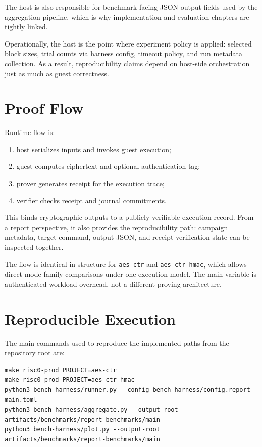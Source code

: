 The host is also responsible for benchmark-facing JSON output fields used by the
aggregation pipeline, which is why implementation and evaluation chapters are
tightly linked.

Operationally, the host is the point where experiment policy is applied:
selected block sizes, trial counts via harness config, timeout policy, and run
metadata collection. As a result, reproducibility claims depend on host-side
orchestration just as much as guest correctness.

\section{Proof Flow}

Runtime flow is:

\begin{enumerate}
\item host serializes inputs and invokes guest execution;
\item guest computes ciphertext and optional authentication tag;
\item prover generates receipt for the execution trace;
\item verifier checks receipt and journal commitments.
\end{enumerate}

This binds cryptographic outputs to a publicly verifiable execution record.
From a report perspective, it also provides the reproducibility path: campaign
metadata, target command, output JSON, and receipt verification state can be
inspected together.

The flow is identical in structure for \texttt{aes-ctr} and
\texttt{aes-ctr-hmac}, which allows direct mode-family comparisons under one
execution model. The main variable is authenticated-workload overhead, not a
different proving architecture.

\section{Reproducible Execution}

The main commands used to reproduce the implemented paths from the repository
root are:

\begin{verbatim}
make risc0-prod PROJECT=aes-ctr
make risc0-prod PROJECT=aes-ctr-hmac
python3 bench-harness/runner.py --config bench-harness/config.report-main.toml
python3 bench-harness/aggregate.py --output-root artifacts/benchmarks/report-benchmarks/main
python3 bench-harness/plot.py --output-root artifacts/benchmarks/report-benchmarks/main
\end{verbatim}

